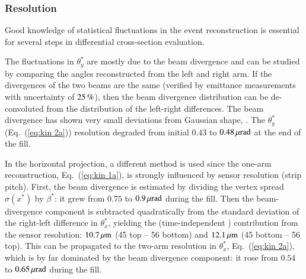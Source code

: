 
\subsubsection{Resolution}
\label{sec:resolution}

Good knowledge of statistical fluctuations in the event reconstruction is essential for several steps in differential cross-section evaluation.

The fluctuations in $\theta_y^*$ are mostly due to the beam divergence and can be studied by comparing the angles reconstructed from the left and right arm. If the divergences of the two beams are the same (verified by emittance measurements with uncertainty of $25\,{\rm \%}$), then the beam divergence distribution can be de-convoluted from the distribution of the left-right differences. The beam divergence has shown very small deviations from Gaussian shape, . The $\theta_y^*$ (Eq.~(\ref{eq:kin 2a})) resolution degraded from initial $0.43$ to $0.48\,{\rm \mu rad}$ at the end of the fill.

In the horizontal projection, a different method is used since the one-arm reconstruction, Eq.~(\ref{eq:kin 1a}), is strongly influenced by sensor resolution (strip pitch). First, the beam divergence is estimated by dividing the vertex spread $\sigma(x^*)$ by $\beta^*$: it grew from $0.75$ to $0.9\,{\rm \mu rad}$ during the fill. Then the beam-divergence component is subtracted quadratically  
from the standard deviation of the right-left difference in $\theta_x^*$, yielding the (time-independent ) contribution from the sensor resolution: $10.7\,{\rm \mu m}$ (45 top -- 56 bottom) and $12.1\,{\rm \mu m}$ (45 bottom -- 56 top). This can be propagated to the two-arm resolution in $\theta_x^*$, Eq.~({\ref{eq:kin 2a}}), which is by far dominated by the beam divergence component: it rose from $0.54$ to $0.65\,{\rm \mu rad}$ during the fill. 


